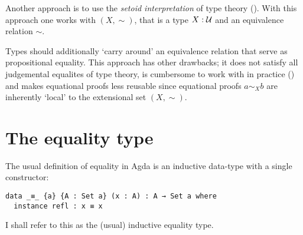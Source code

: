 Another approach is to use the \emph{setoid interpretation} of type theory
(\cite{hofmann-1995,huber-2016}). With this approach one works with
 $(X, \sim)$, that is a type $X \;\mathord{:}\; \mathcal{U}$ and an
equivalence relation $\sim$.

Types should additionally `carry around' an equivalence relation that serve as
propositional equality. This approach has other drawbacks; it does not satisfy
all judgemental equalites of type theory, is cumbersome to work with in practice
(\cite[p. 4]{huber-2016}) and makes equational proofs less reusable since
equational proofs $a \sim_{X} b$ are inherently `local' to the extensional set
$(X , \sim)$.
%
\section{The equality type}
The usual definition of equality in Agda is an inductive data-type with a single
constructor:
%
\begin{verbatim}
data _≡_ {a} {A : Set a} (x : A) : A → Set a where
  instance refl : x ≡ x
\end{verbatim}
%
I shall refer to this as the (usual) inductive equality type.
